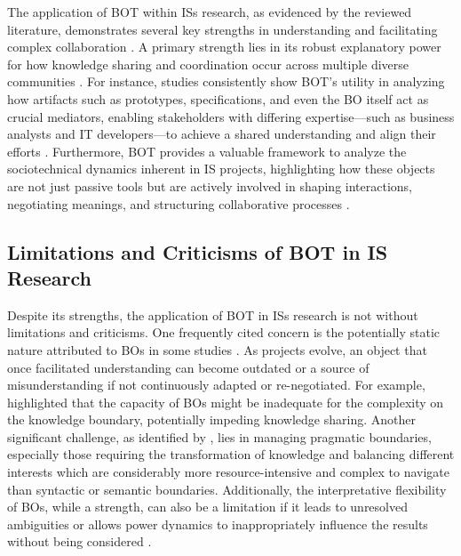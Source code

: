 \documentclass[12pt,oneside]{article}
\begin{document}
The application of \ac{BOT} within \ac{IS}s research, as evidenced by the reviewed literature, demonstrates several key strengths in understanding and facilitating complex collaboration . A primary strength lies in its robust explanatory power for how knowledge sharing and coordination occur across multiple diverse communities \citep[6372]{vanlooy2024theoretical}. For instance, studies consistently show \ac{BOT}'s utility in analyzing how artifacts such as prototypes, specifications, and even the \ac{BO} itself act as crucial mediators, enabling stakeholders with differing expertise—such as business analysts and \ac{IT} developers—to achieve a shared understanding and align their efforts \citep[5118]{weeger2017artefacts}. Furthermore, \ac{BOT} provides a valuable framework to analyze the sociotechnical dynamics inherent in \ac{IS} projects, highlighting how these objects are not just passive tools but are actively involved in shaping interactions, negotiating meanings, and structuring collaborative processes \citep[582]{doolin2012sociomateriality}.

\subsection{Limitations and Criticisms of BOT in IS Research} \label{limitations-and-criticisms-of-bot-in-is-research}

Despite its strengths, the application of \ac{BOT} in \ac{IS}s research is not without limitations and criticisms. One frequently cited concern is the potentially static nature attributed to \ac{BO}s in some studies \citep[81]{särner2024prospective}. As projects evolve, an object that once facilitated understanding can become outdated or a source of misunderstanding if not continuously adapted or re-negotiated. For example, \citet[325]{rosenkranz2014boundary} highlighted that the capacity of \ac{BO}s might be inadequate for the complexity on the knowledge boundary, potentially impeding knowledge sharing. Another significant challenge, as identified by \citet[449]{carlile2002pragmatic}, lies in managing pragmatic boundaries, especially those requiring the transformation of knowledge and balancing different interests which are considerably more resource-intensive and complex to navigate than syntactic or semantic boundaries. Additionally, the interpretative flexibility of \ac{BO}s, while a strength, can also be a limitation if it leads to unresolved ambiguities or allows power dynamics to inappropriately influence the results without being considered \citep[1814-1815]{huvila2017boundary}.
\end{document}
